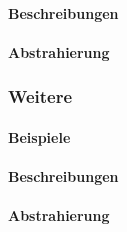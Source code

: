 \paragraph*{Beschreibungen}
\paragraph*{Abstrahierung}

\subsubsection{Weitere}
\paragraph*{Beispiele}
\paragraph*{Beschreibungen}
\paragraph*{Abstrahierung}
